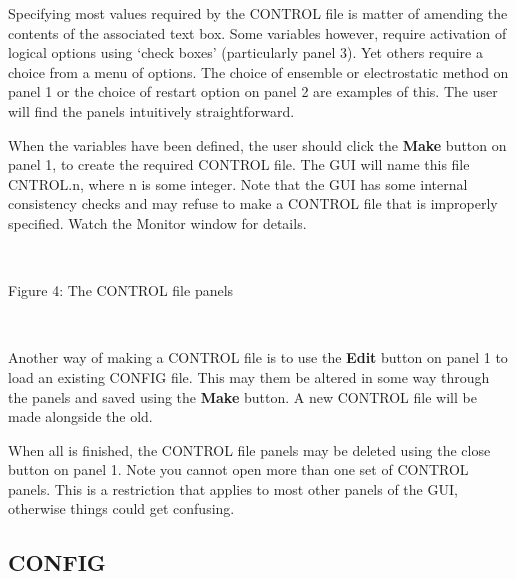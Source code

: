 Specifying most values required by the CONTROL file is matter of
amending the contents of the associated text box. Some variables
however, require activation of logical options using `check boxes'
(particularly panel 3). Yet others require a choice from a menu of
options. The choice of ensemble or electrostatic method on panel 1 or
the choice of restart option on panel 2 are examples of this. The user
will find the panels intuitively straightforward.

When the variables have been defined, the user should click the {\bf
Make} button on panel 1, to create the required CONTROL file. The GUI
will name this file CNTROL.n, where n is some integer. Note that the
GUI has some internal consistency checks and may refuse to make a
CONTROL file that is improperly specified. Watch the Monitor window
for details.

~

\vskip 5mm
\centerline{}
\centerline{Figure 4: The CONTROL file panels}
\vskip 5mm

~

\noindent
Another way of making a CONTROL file is to use the {\bf Edit} button
on panel 1 to load an existing CONFIG file. This may them be altered
in some way through the panels and saved using the {\bf Make}
button. A new CONTROL file will be made alongside the old. 

When all is finished, the CONTROL file panels may be deleted using the
close button on panel 1. Note you cannot open more than one set of
CONTROL panels. This is a restriction that applies to most
other panels of the GUI, otherwise things could get confusing.

\subsection{CONFIG}

